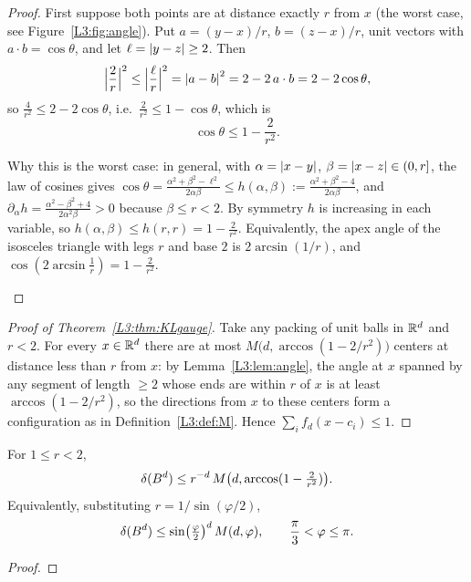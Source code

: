 \begin{proof}
First suppose both points are at distance exactly $r$ from $x$ (the worst case, see Figure~\ref{L3:fig:angle}).
Put $a=(y-x)/r$, $b=(z-x)/r$, unit vectors with $a\cdot b=\cos\theta$, and let $\ell=\left\lvert y-z \right\rvert\ge2$. Then
\[
  \Bigl|\frac2r\Bigr|^2\le\Bigl|\frac{\ell}{r}\Bigr|^2=\left\lvert a-b \right\rvert^2=2-2\,a\cdot b=2-2\cos\theta,
\]
so $\frac{4}{r^2}\le 2-2\cos\theta$, i.e.\ $\frac2{r^2}\le1-\cos\theta$, which is
\[
  \boxed{\cos\theta\le 1-\frac{2}{r^2}.}
\]
\begin{addedblock}
Why this is the worst case: in general, with $\alpha=\left\lvert x-y \right\rvert$, $\beta=\left\lvert x-z \right\rvert\in(0,r]$, the law of cosines gives
$\cos\theta=\frac{\alpha^2+\beta^2-\ell^2}{2\alpha\beta}\le h(\alpha,\beta):=\frac{\alpha^2+\beta^2-4}{2\alpha\beta}$, and
$\partial_\alpha h=\frac{\alpha^2-\beta^2+4}{2\alpha^2\beta}>0$ because $\beta\le r<2$. By symmetry $h$ is increasing in each variable,
so $h(\alpha,\beta)\le h(r,r)=1-\frac2{r^2}$. Equivalently, the apex angle of the isosceles triangle with legs $r$ and base $2$ is
$2\arcsin(1/r)$, and $\cos(2\arcsin\frac1r)=1-\frac2{r^2}$.
\end{addedblock}
%
\end{proof}

\begin{proof}[Proof of Theorem~\ref{L3:thm:KLgauge}]
Take any packing of unit balls in $\mathbb{R}^d$ and $r<2$. For every $x\in\mathbb{R}^d$ there are at most $M\bigl(d,\arccos(1-2/r^2)\bigr)$ centers at
distance less than $r$ from $x$: by Lemma~\ref{L3:lem:angle}, the angle at $x$ spanned by any segment of length $\ge2$ whose ends are within
$r$ of $x$ is at least $\arccos(1-2/r^2)$, so the directions from $x$ to these centers form a configuration as in
Definition~\ref{L3:def:M}. 
Hence $\sum_i f_d(x-c_i)\le 1$.
\end{proof}

\begin{corollary}\label{L3:cor:KL}
For $1\le r<2$,
\[
  \delta(B^d)\le r^{-d}\,M\bigl(d,\arccos(1-\tfrac{2}{r^2})\bigr).
\]
Equivalently, substituting $r=1/\sin(\varphi/2)$,
\[
  \delta(B^d)\le \sin\bigl(\tfrac\varphi2\bigr)^d\,M(d,\varphi),\qquad \frac\pi3<\varphi\le\pi.
\]
\end{corollary}
\begin{proof}
\end{proof}

